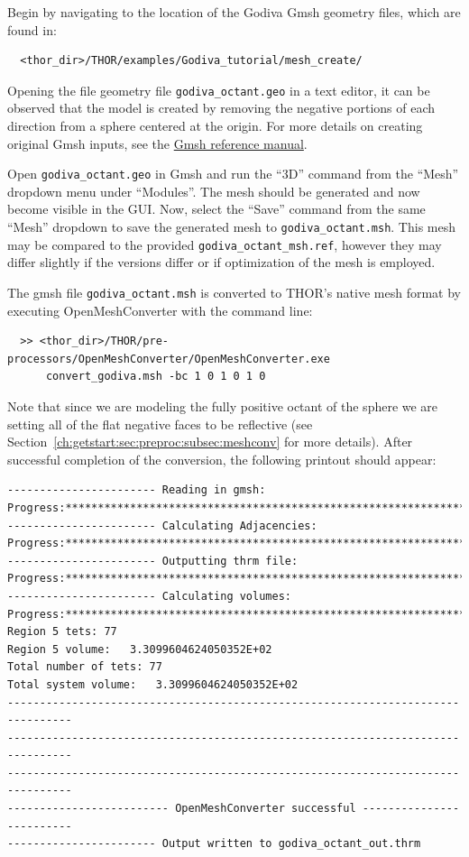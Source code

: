 Begin by navigating to the location of the Godiva Gmsh geometry files, which are found in:
\begin{verbatim}
  <thor_dir>/THOR/examples/Godiva_tutorial/mesh_create/
\end{verbatim}
Opening the file geometry file \verb"godiva_octant.geo" in a text editor, it can be observed that the model is created by removing the negative portions of each direction from a sphere centered at the origin.
For more details on creating original Gmsh inputs, see the \href{https://gmsh.info/doc/texinfo/gmsh.html}{Gmsh reference manual}.

Open \verb"godiva_octant.geo" in Gmsh and run the ``3D'' command from the ``Mesh'' dropdown menu under ``Modules''.
The mesh should be generated and now become visible in the \ac{GUI}.
Now, select the ``Save'' command from the same ``Mesh'' dropdown to save the generated mesh to \verb"godiva_octant.msh".
This mesh may be compared to the provided \verb"godiva_octant_msh.ref", however they may differ slightly if the versions differ or if optimization of the mesh is employed.

The gmsh file \verb"godiva_octant.msh" is converted to \ac{THOR}'s native mesh format by executing OpenMeshConverter with the command line:
\begin{verbatim}
  >> <thor_dir>/THOR/pre-processors/OpenMeshConverter/OpenMeshConverter.exe
      convert_godiva.msh -bc 1 0 1 0 1 0
\end{verbatim}
Note that since we are modeling the fully positive octant of the sphere we are setting all of the flat negative faces to be reflective (see Section~\ref{ch:getstart:sec:preproc:subsec:meshconv} for more details).
After successful completion of the conversion, the following printout should appear:
\begin{verbatim}
----------------------- Reading in gmsh:
Progress:***********************************************************************
----------------------- Calculating Adjacencies:
Progress:***********************************************************************
----------------------- Outputting thrm file:
Progress:***********************************************************************
----------------------- Calculating volumes:
Progress:***********************************************************************
Region 5 tets: 77
Region 5 volume:   3.3099604624050352E+02
Total number of tets: 77
Total system volume:   3.3099604624050352E+02
--------------------------------------------------------------------------------
--------------------------------------------------------------------------------
--------------------------------------------------------------------------------
------------------------- OpenMeshConverter successful -------------------------
----------------------- Output written to godiva_octant_out.thrm
\end{verbatim}

